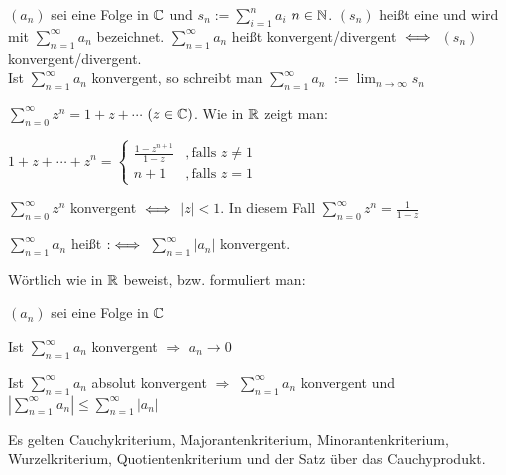 \documentclass[a4paper,twoside,DIV15,BCOR12mm]{scrbook}
\def\gdw{\equizu}
\def\gdw{\equizu}
\begin{document}
\begin{definition}
$(a_n)$ sei eine Folge in $\mathbb{C}$ und $s_n := \sum_{i=1}^{n} a_i$ $n\in \mathbb{N}$. $(s_n)$ heißt eine  und wird mit 
$\sum_{n=1}^{\infty} a_n$ bezeichnet. $\sum_{n=1}^{\infty} a_n$ heißt konvergent/divergent $\gdw$ $(s_n)$ konvergent/divergent. \\
Ist $\sum_{n=1}^{\infty} a_n$ konvergent, so schreibt man $\sum_{n=1}^{\infty} a_n$ $:= \lim_{n \to \infty} s_n$ 
\end{definition}

\begin{beispiel}
$\sum_{n=0}^{\infty} z^n = 1+z+\cdots$ $(z \in \mathbb{C})$. Wie in $\mathbb{R}$ zeigt man:
\begin{liste}
\item $1+z+\cdots+z^n =\begin{cases}
		\frac{1-z^{n+1}}{1-z} &, \text{falls } z \neq 1 \\
		n+1 &, \text{falls } z = 1
		\end{cases}
		$
\item $\sum_{n=0}^{\infty} z^n$ konvergent $\gdw$ $|z| < 1$. In diesem Fall $\sum_{n=0}^{\infty} z^n = \frac{1}{1-z}$ 
\end{liste}
\end{beispiel}

\begin{definition}
$\sum_{n=1}^{\infty} a_n $ heißt  $:\gdw$ $\sum_{n=1}^{\infty} |a_n|$ konvergent.
\end{definition}

Wörtlich wie in $\mathbb{R}$ beweist, bzw. formuliert man:
\begin{satz}
$(a_n)$ sei eine Folge in $\mathbb{C}$
\begin{liste}
\item Ist $\sum_{n=1}^{\infty} a_n$ konvergent $\Rightarrow$ $a_n \to 0$
\item Ist $\sum_{n=1}^{\infty} a_n$ absolut konvergent $\Rightarrow$ $\sum_{n=1}^{\infty} a_n$ konvergent und $|\sum_{n=1}^{\infty} a_n| \leq \sum_{n=1}^{\infty} |a_n|$
\item Es gelten Cauchykriterium, Majorantenkriterium, Minorantenkriterium, Wurzelkriterium, Quotientenkriterium und der Satz über das Cauchyprodukt.
\end{liste}
\end{satz}
\end{document}
